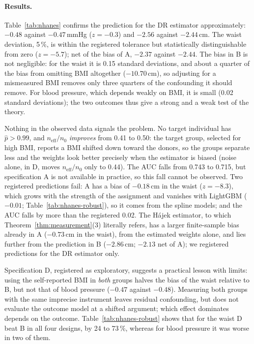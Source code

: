 \documentclass[11pt,a4paper]{article}
\newcommand{\neff}{n_{\mathrm{eff}}}
\theoremstyle{plain}
\theoremstyle{definition}
\begin{document}
\paragraph{Results.} Table~\ref{tab:nhanes} confirms the prediction for the DR estimator approximately: $-0.48$ against $-0.47$\,mmHg ($z=-0.3$) and $-2.56$ against $-2.44$\,cm. The waist deviation, 5\,\%, is within the registered tolerance but statistically distinguishable from zero ($z=-5.7$); net of the bias of A, $-2.37$ against $-2.44$. The bias in B is not negligible: for the waist it is 0.15 standard deviations, and about a quarter of the bias from omitting BMI altogether ($-10.70$\,cm), so adjusting for a mismeasured BMI removes only three quarters of the confounding it should remove. For blood pressure, which depends weakly on BMI, it is small (0.02 standard deviations); the two outcomes thus give a strong and a weak test of the theory.

Nothing in the observed data signals the problem. No target individual has $\hat p>0.99$, and $\neff/n_0$ \emph{improves} from 0.41 to 0.50: the target group, selected for high BMI, reports a BMI shifted down toward the donors, so the groups separate less and the weights look better precisely when the estimator is biased (noise alone, in D, moves $\neff/n_0$ only to 0.44). The AUC falls from 0.743 to 0.715, but specification A is not available in practice, so this fall cannot be observed. Two registered predictions fail: A has a bias of $-0.18$\,cm in the waist ($z=-8.3$), which grows with the strength of the assignment and vanishes with LightGBM ($-0.01$; Table~\ref{tab:nhanes-robust}), so it comes from the spline models; and the AUC falls by more than the registered 0.02. The H\'ajek estimator, to which Theorem~\ref{thm:measurement}(3) literally refers, has a larger finite-sample bias already in A ($-0.73$\,cm in the waist), from the estimated weights alone, and lies further from the prediction in B ($-2.86$\,cm; $-2.13$ net of A); we registered predictions for the DR estimator only.

Specification D, registered as exploratory, suggests a practical lesson with limits: using the self-reported BMI in \emph{both} groups halves the bias of the waist relative to B, but not that of blood pressure ($-0.47$ against $-0.48$). Measuring both groups with the same imprecise instrument leaves residual confounding, but does not evaluate the outcome model at a shifted argument; which effect dominates depends on the outcome. Table~\ref{tab:nhanes-robust} shows that for the waist D beat B in all four designs, by 24 to 73\,\%, whereas for blood pressure it was worse in two of them.
\end{document}
